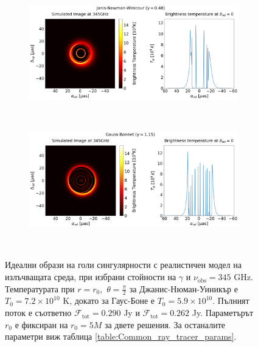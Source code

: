 \begin{figure}[h!]
	\centering
	\begin{subfigure}{12cm}
		\hspace{-0cm}
		\includegraphics[scale = 0.25]{Ray_tracer_plot_345_JNW.png}
	\end{subfigure}\\
	\begin{subfigure}{12cm}
		\hspace{-0cm}
		\includegraphics[scale = 0.25]{Ray_tracer_plot_345_GB.png}
	\end{subfigure}\\
	\label{Naked_Singularity_Ray_tracer_345}
	\caption[Идеални образи на голи сингулярности с реалистичен модел на излъчващата среда, при избрани стойности на $\gamma$ и $\nu_\text{obs} = 345$ GHz.]{\small Идеални образи на голи сингулярности с реалистичен модел на излъчващата среда, при избрани стойности на $\gamma$ и $\nu_\text{obs} = 345$ GHz. Температурата при $r = r_0,\,\,\theta = \frac{\pi}{2}$ за Джанис-Нюман-Уиникър е $T_0 = 7.2\times10^{10}$ K, докато за Гаус-Боне е $T_0 = 5.9\times10^{10}$. Пълният поток е съответно $\mathcal{F}_{\text{tot}} = 0.290$ Jy и $\mathcal{F}_{\text{tot}} = 0.262$ Jy. Параметърът $r_0$ е фиксиран на $r_0 = 5M$ за двете решения. За останалите параметри виж таблица \ref{table:Common_ray_tracer_params}.} 
\end{figure}